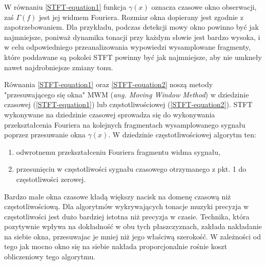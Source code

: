 \documentclass[12pt,a4paper,twoside]{mwart}
\begin{document}
W równaniu \ref{STFT-equation1} funkcja $\gamma(x)$ oznacza czasowe okno obserwacji, zaś $\Gamma(f)$ jest jej widmem Fouriera. Rozmiar okna dopierany jest zgodnie z zapotrzebowaniem. Dla przykładu, podczas detekcji mowy okno powinno być jak najmniejsze, poniważ dynamika tonacji przy każdym słowie jest bardzo wysoka, i w celu odpowiedniego przeanalizowania wypowiedzi wysamplowane fragmenty, które poddawane są pokolei STFT powinny być jak najmniejsze, aby nie umkneły nawet najdrobniejsze zmiany tonu\cite{MultipleFundamentalFrequencyEstimation}.

Równania \ref{STFT-equation1} oraz \ref{STFT-equation2} noszą metody "przesuwającego się okna" MWM (\textit{ang. Moving Window Method}) w dziedzinie czasowej (\ref{STFT-equation1}) lub częstotliwościowej (\ref{STFT-equation2}). STFT wykonywane na dziedzinie czasowej sprowadza się do wykonywania przekształcenia Fouriera na kolejnych fragmentach wysamplowanego sygnału poprzez przesuwanie okna $\gamma(x)$. W dziedzinie częstotliwościowej algorytm ten:
\begin{enumerate}
  \item odwrotnemu przekształceniu Fouriera fragmentu widma sygnału,
  \item przesunięciu w częstotliwości sygnału czasowego otrzymanego z pkt. 1 do częstotliwości zerowej.
\end{enumerate}
\cite[455-458]{CyfrowePrzetwarzanieSygnalowOdTeoriiDoZastosowan}

Bardzo małe okna czasowe kładą większy nacisk na domenę czasową niż częstotliwościową. Dla algorytmów wykrywających tonacje muzyki precyzja w częstotliwości jest dużo bardziej istotna niż precyzja w czasie. Technika, która pozytywnie wpływa na dokładność w obu tych płaszczyznach, zakłada nakładanie na siebie okna, przesuwajac je mniej niż jego właściwą szerokość. W zależności od tego jak mocno okno się na siebie nakłada proporcjonalnie rośnie koszt obliczeniowy tego algorytmu. \cite{WindowChoiceStrategiesSTFT}
\end{document}
